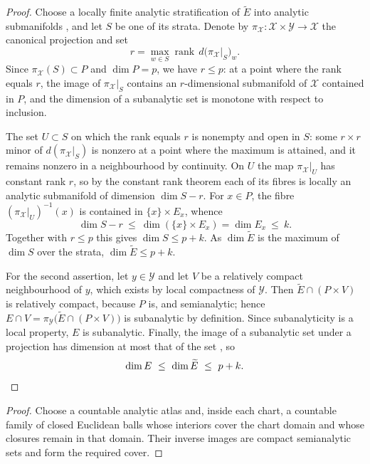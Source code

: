 \documentclass[11pt,oneside]{amsart}
\theoremstyle{plain}
\newtheorem{lemma}[theorem]{Lemma}
\theoremstyle{definition}
\theoremstyle{remark}
\newcommand{\calX}{\mathcal{X}}
\newcommand{\calY}{\mathcal{Y}}
\newcommand{\restr}[2]{\left.#1\right|_{#2}}
\begin{document}
\begin{proof}
Choose a locally finite analytic stratification of $\widetilde E$ into analytic
submanifolds \cite{bierstone1988semianalytic}, and let $S$ be one of its strata.
Denote by $\pi_\calX\colon\calX\times\calY\to\calX$ the canonical projection and set
\[
    r=\max_{w\in S}\operatorname{rank}\,d\bigl(\restr{\pi_\calX}{S}\bigr)_w .
\]
Since $\pi_\calX(S)\subset P$ and $\dim P=p$, we have $r\leq p$: at a point where the
rank equals $r$, the image of $\restr{\pi_\calX}{S}$ contains an $r$-dimensional
submanifold of $\calX$ contained in $P$, and the dimension of a subanalytic set is
monotone with respect to inclusion.
 
The set $U\subset S$ on which the rank equals $r$ is nonempty and open in $S$: some
$r\times r$ minor of $d(\restr{\pi_\calX}{S})$ is nonzero at a point where the maximum
is attained, and it remains nonzero in a neighbourhood by continuity. On $U$ the map
$\restr{\pi_\calX}{U}$ has constant rank $r$, so by the constant rank theorem
\cite[\S2.2]{narasimhan1985analysis} each of its fibres is locally an analytic
submanifold of dimension $\dim S-r$. For $x\in P$, the fibre
$(\restr{\pi_\calX}{U})^{-1}(x)$ is contained in $\{x\}\times E_x$, whence
\[
    \dim S-r\ \leq\ \dim(\{x\}\times E_x)=\dim E_x\ \leq\ k .
\]
Together with $r\leq p$ this gives $\dim S\leq p+k$. As $\dim\widetilde E$ is the
maximum of $\dim S$ over the strata, $\dim\widetilde E\leq p+k$.
 
For the second assertion, let $y\in\calY$ and let $V$ be a relatively compact
neighbourhood of $y$, which exists by local compactness of $\calY$. Then
$\widetilde E\cap(P\times V)$ is relatively compact, because $P$ is, and semianalytic;
hence $E\cap V=\pi_\calY\bigl(\widetilde E\cap(P\times V)\bigr)$ is subanalytic by
definition. Since subanalyticity is a local property, $E$ is subanalytic. Finally, the
image of a subanalytic set under a projection has dimension at most that of the set
\cite{bierstone1988semianalytic}, so
\[
    \dim E\ \leq\ \dim\widetilde E\ \leq\ p+k. \qedhere
\]
\end{proof}



\begin{proof}
Choose a countable analytic atlas and, inside each chart, a countable family of closed Euclidean balls whose interiors cover the chart domain and whose closures remain in that domain. Their inverse images are compact semianalytic sets and form the required cover.
\end{proof}
\end{document}
